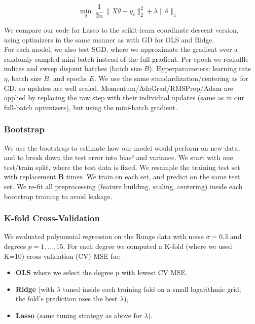 \documentclass[amssymb,twocolumn,aps,floatfix]{revtex4-2}
\begin{document}
\begin{equation}
    \min_{\theta}\ \frac{1}{2n}\,\|X\theta - y_c\|_2^2 + \lambda \|\theta\|_1
\end{equation}

We compare our code for Lasso to the scikit-learn coordinate descent version, using optimizers in the same manner as with GD for OLS and Ridge. \\ 

For each model, we also test SGD, where we approximate the gradient over a randomly sampled mini-batch instead of the full gradient. Per epoch we reshuffle indices and sweep disjoint batches (batch size $B$).
Hyperparameters: learning rate $\eta$, batch size $B$, and epochs $E$.
We use the same standardization/centering as for GD, so updates are well scaled. Momentum/AdaGrad/RMSProp/Adam are applied by replacing the raw step with their individual updates (same as in our full-batch optimizers), but using the mini-batch gradient.

\subsubsection{Bootstrap}
\label{subsubsec:boot}

We use the bootstrap to estimate how our model would perform on new data, and to break down the test error into bias² and variance. We start with one test/train split, where the test data is fixed. We resample the training test set with replacement \textbf{B} times. We train on each set, and predict on the same test set. We re-fit all preprocessing (feature building, scaling, centering) inside each bootstrap training to avoid leakage.

\subsubsection{K-fold Cross-Validation}
\label{subsubsec:cv}

We evaluated polynomial regression on the Runge data with noise $\sigma=0.3$ and degrees $p=1,\dots,15$.
For each degree we computed a K-fold (where we used K=10) cross-validation (CV) MSE for:
\begin{itemize}
    \item \textbf{OLS} where we select the degree p with lowest CV MSE. 
    \item \textbf{Ridge} (with $\lambda$ tuned inside each training fold on a small logarithmic grid; the fold’s prediction uses the best $\lambda$),
    \item \textbf{Lasso} (same tuning strategy as above for $\lambda$).
\end{itemize}
\end{document}
